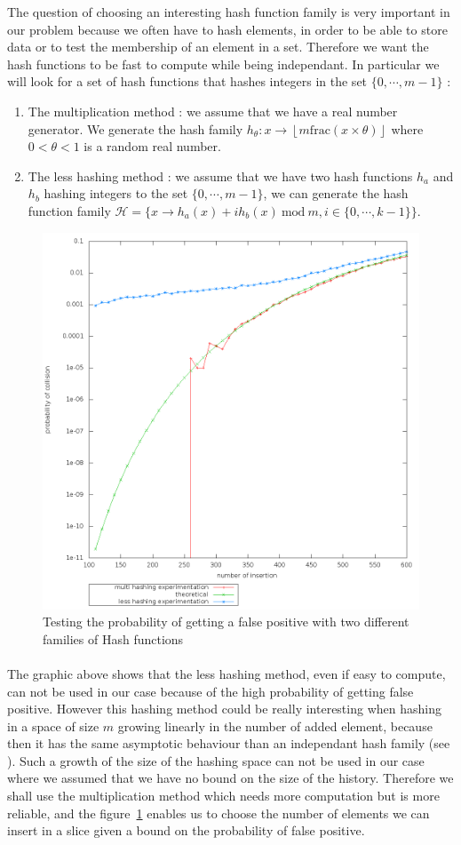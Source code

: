 The question of choosing an interesting hash function family is very important in our problem because we often have to hash elements, in order to be able to store data or to test the membership of an element in a set. Therefore we want the hash functions to be fast to compute while being independant. In particular we will look for a set of hash functions that hashes integers in the set $\{0,\cdots,m-1\}$ :
\begin{enumerate}
 \item The multiplication method : we assume that we have a real number generator. We generate the hash family $h_{\theta} :  x \rightarrow \left \lfloor m \mathrm{frac}(x\times \theta) \right \rfloor$ where $0<\theta<1$ is a random real number.
 \item The less hashing method : we assume that we have two hash functions $h_a$ and $h_b$ hashing integers to the set $\{0,\cdots,m-1\}$, we can generate the hash function family $\mathcal{H} = \{
 x \rightarrow h_a(x) + i h_b(x) 
 \mathrm{\ mod\ } m
 , i \in 
 \{0,\cdots,k-1\} 
 \}$.
\end{enumerate}

\begin{figure}[H]
\centering
 \includegraphics[width = 0.5\linewidth]{./image/bf/false_positive_probability.png}
 \caption{Testing the probability of getting a false positive with two different families of Hash functions} \label{fig:fpp}
\end{figure}
\paragraph{} The graphic above shows that the less hashing method, even if easy to compute, can not be used in our case because of the high probability of getting false positive. However this hashing method could be really interesting when hashing in a space of size $m$ growing linearly in the number of added element, because then it has the same asymptotic behaviour than an independant hash family (see \cite{DBLP:journals/rsa/KirschM08}). Such a growth of the size of the hashing space can not be used in our case where we assumed that we have no bound on the size of the history. Therefore we shall use the multiplication method which needs more computation but is more reliable, and the figure~\ref{fig:fpp} enables us to choose the number of elements we can insert in a slice given a bound on the probability of false positive.